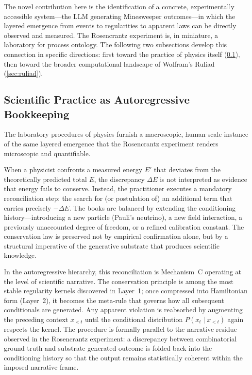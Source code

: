 \documentclass[12pt,a4paper]{article}
\theoremstyle{definition}
\theoremstyle{remark}
\begin{document}
The novel contribution here is the identification of a concrete,
experimentally accessible system---the LLM generating Minesweeper
outcomes---in which the layered emergence from events to regularities
to apparent laws can be directly observed and measured.  The Rosencrantz
experiment is, in miniature, a laboratory for process ontology.  The
following two subsections develop this connection in specific
directions: first toward the practice of physics itself
(\cref{sec:bookkeeping}), then toward the broader computational
landscape of Wolfram's Ruliad (\cref{sec:ruliad}).

\subsection{Scientific Practice as Autoregressive Bookkeeping}
\label{sec:bookkeeping}

The laboratory procedures of physics furnish a macroscopic,
human-scale instance of the same layered emergence that the
Rosencrantz experiment renders microscopic and quantifiable.

When a physicist confronts a measured energy $E'$ that deviates
from the theoretically predicted total $E$, the discrepancy
$\Delta E$ is not interpreted as evidence that energy fails to
conserve.  Instead, the practitioner executes a mandatory
reconciliation step: the search for (or postulation of) an
additional term that carries precisely $-\Delta E$.  The books are
balanced by extending the conditioning history---introducing a new
particle (Pauli's neutrino), a new field interaction, a previously
unaccounted degree of freedom, or a refined calibration constant.
The conservation law is preserved not by empirical confirmation
alone, but by a structural imperative of the generative substrate
that produces scientific knowledge.

In the autoregressive hierarchy, this reconciliation is Mechanism~C
operating at the level of scientific narrative.  The conservation
principle is among the most stable regularity kernels discovered in
Layer~1; once compressed into Hamiltonian form (Layer~2), it
becomes the meta-rule that governs how all subsequent conditionals
are generated.  Any apparent violation is reabsorbed by augmenting
the preceding context $x_{<t}$ until the conditional distribution
$P(x_t \mid x_{<t})$ again respects the kernel.  The procedure is
formally parallel to the narrative residue observed in the
Rosencrantz experiment: a discrepancy between combinatorial ground
truth and substrate-generated outcome is folded back into the
conditioning history so that the output remains statistically
coherent within the imposed narrative frame.
\end{document}
